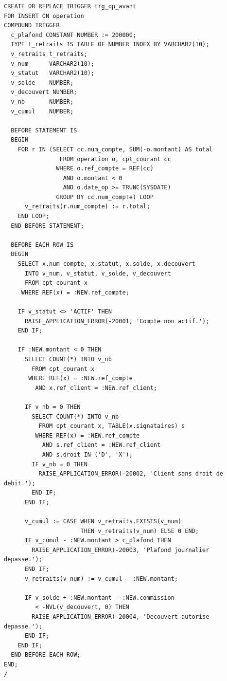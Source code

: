 \begin{lstlisting}[caption={Trigger \code{COMPOUND} de validation des opérations.},label={lst:trg-avant}]
CREATE OR REPLACE TRIGGER trg_op_avant
FOR INSERT ON operation
COMPOUND TRIGGER
  c_plafond CONSTANT NUMBER := 200000;
  TYPE t_retraits IS TABLE OF NUMBER INDEX BY VARCHAR2(10);
  v_retraits t_retraits;
  v_num      VARCHAR2(10);
  v_statut   VARCHAR2(10);
  v_solde    NUMBER;
  v_decouvert NUMBER;
  v_nb       NUMBER;
  v_cumul    NUMBER;

  BEFORE STATEMENT IS
  BEGIN
    FOR r IN (SELECT cc.num_compte, SUM(-o.montant) AS total
                FROM operation o, cpt_courant cc
               WHERE o.ref_compte = REF(cc)
                 AND o.montant < 0
                 AND o.date_op >= TRUNC(SYSDATE)
               GROUP BY cc.num_compte) LOOP
      v_retraits(r.num_compte) := r.total;
    END LOOP;
  END BEFORE STATEMENT;

  BEFORE EACH ROW IS
  BEGIN
    SELECT x.num_compte, x.statut, x.solde, x.decouvert
      INTO v_num, v_statut, v_solde, v_decouvert
      FROM cpt_courant x
     WHERE REF(x) = :NEW.ref_compte;

    IF v_statut <> 'ACTIF' THEN
      RAISE_APPLICATION_ERROR(-20001, 'Compte non actif.');
    END IF;

    IF :NEW.montant < 0 THEN
      SELECT COUNT(*) INTO v_nb
        FROM cpt_courant x
       WHERE REF(x) = :NEW.ref_compte
         AND x.ref_client = :NEW.ref_client;

      IF v_nb = 0 THEN
        SELECT COUNT(*) INTO v_nb
          FROM cpt_courant x, TABLE(x.signataires) s
         WHERE REF(x) = :NEW.ref_compte
           AND s.ref_client = :NEW.ref_client
           AND s.droit IN ('D', 'X');
        IF v_nb = 0 THEN
          RAISE_APPLICATION_ERROR(-20002, 'Client sans droit de debit.');
        END IF;
      END IF;

      v_cumul := CASE WHEN v_retraits.EXISTS(v_num)
                      THEN v_retraits(v_num) ELSE 0 END;
      IF v_cumul - :NEW.montant > c_plafond THEN
        RAISE_APPLICATION_ERROR(-20003, 'Plafond journalier depasse.');
      END IF;
      v_retraits(v_num) := v_cumul - :NEW.montant;

      IF v_solde + :NEW.montant - :NEW.commission
         < -NVL(v_decouvert, 0) THEN
        RAISE_APPLICATION_ERROR(-20004, 'Decouvert autorise depasse.');
      END IF;
    END IF;
  END BEFORE EACH ROW;
END;
/
\end{lstlisting}

